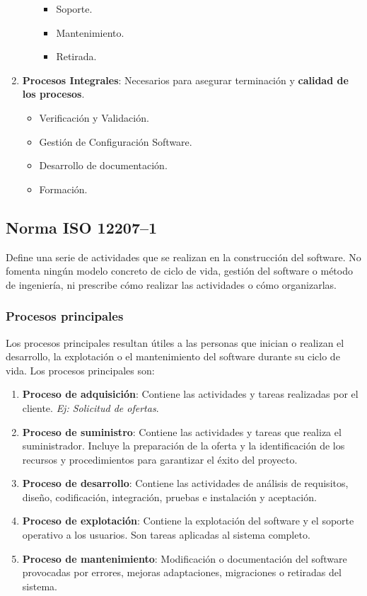 \begin{enumerate}
\begin{itemize}
\begin{itemize}
            \item Soporte.
            \item Mantenimiento.
            \item Retirada.
        \end{itemize}
    \end{itemize}
    \item \textbf{Procesos Integrales}: Necesarios para asegurar terminación y \textbf{calidad de los procesos}.
    \begin{itemize}
        \item Verificación y Validación.
        \item Gestión de Configuración Software.
        \item Desarrollo de documentación.
        \item Formación.
    \end{itemize}
\end{enumerate}

\subsection{Norma ISO 12207--1}
 Define una serie de actividades que se realizan en la construcción del software. No fomenta ningún modelo concreto de ciclo de vida, gestión del software o método de ingeniería, ni prescribe cómo realizar las actividades o cómo organizarlas.

\subsubsection{Procesos principales}
Los procesos principales resultan útiles a las personas que inician o realizan el desarrollo, la explotación o el mantenimiento del software durante su ciclo de vida. Los procesos principales son:
\begin{enumerate}
    \item \textbf{Proceso de adquisición}: Contiene las actividades y tareas realizadas por el cliente. \textit{Ej: Solicitud de ofertas}.
    \item \textbf{Proceso de suministro}: Contiene las actividades y tareas que realiza el suministrador. Incluye la preparación de la oferta y la identificación de los recursos y procedimientos para garantizar el éxito del proyecto.
    \item\textbf{Proceso de desarrollo}: Contiene las actividades de análisis de requisitos, diseño, codificación, integración, pruebas e instalación y aceptación. 
    \item \textbf{Proceso de explotación}: Contiene la explotación del software y el soporte operativo a los usuarios. Son tareas aplicadas al sistema completo.
    \item \textbf{Proceso de mantenimiento}: Modificación o documentación del software provocadas por errores, mejoras adaptaciones, migraciones o retiradas del sistema.
\end{enumerate}

